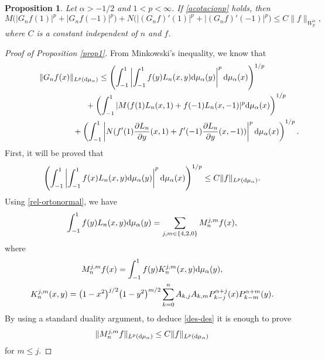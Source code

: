 \documentclass[pdftex]{sigma}
\newtheorem{propo}[thm]{Proposition}
\numberwithin{equation}{section}
\begin{document}
\begin{propo}\label{prop2} Let $\alpha>-1/2$ and $1<p<\infty$. If \eqref{acotacionp} holds, then
	\begin{equation*}
M\big(|G_nf(1)|^p+|G_nf(-1)|^p\big)+N\big(|(G_nf)'(1)|^p+|(G_nf)'(-1)|^p\big)\le C\|f\|_{W_p^{\alpha}},
	\end{equation*}
where $C$ is a constant independent of $n$ and $f$.
\end{propo}

\begin{proof}[Proof of Proposition \ref{prop1}] From Minkowski's inequality, we know that
	\begin{gather*}
	\|G_nf(x)\|_{L^p({\rm d}\mu_{\alpha})}\le
	\left(\int_{-1}^{1}\left|\int_{-1}^{1}f(y)L_n(x,y) {\rm d}{\mu_{\alpha}}(y)\right|^p {\rm d}\mu_{\alpha}(x)\right)^{1/p}\\
\hphantom{\|G_nf(x)\|_{L^p({\rm d}\mu_{\alpha})}\le}{}	+\left(\int_{-1}^{1}|M(f(1)L_n(x,1)+f(-1)L_n(x,-1)|^p {\rm d}\mu_{\alpha}(x)\right)^{1/p}\\
\hphantom{\|G_nf(x)\|_{L^p({\rm d}\mu_{\alpha})}\le}{}	+\left(\int_{-1}^{1}\left|N(f'(1)\frac{\partial L_n}{\partial y}(x,1)+f'(-1)\frac{\partial L_n}{\partial y}(x,-1))\right|^p {\rm d}\mu_{\alpha}(x)\right)^{1/p}.
	\end{gather*}	
First, it will be proved that
\begin{gather}\label{des-des}
\left(\int_{-1}^{1}\left|\int_{-1}^{1}f(x)L_n(x,y) {\rm d}\mu_{\alpha}(y)\right|^p {\rm d}\mu_{\alpha}(x)\right)^{1/p}\le C\|f\|_{L^p({\rm d}\mu_{\alpha})}.
	\end{gather}
Using \eqref{rel-ortonormal}, we have
	\begin{gather*}
	\int_{-1}^{1}f(y)L_n(x,y) {\rm d}\mu_{\alpha}(y)=\sum_{j,m\in \{4,2,0\}}M_n^{j,m}f(x),
	\end{gather*}
where
\begin{gather*}
M_n^{j,m}f(x)=\int_{-1}^{1} f(y) K_n^{j,m}(x,y) {\rm d}\mu_\alpha(y),\\
K_n^{j,m}(x,y)=\big(1-x^2\big)^{j/2}\big(1-y^2\big)^{m/2}\sum_{k=0}^{n}A_{k,j}A_{k,m}P_{k-j}^{\alpha+j}(x)P_{k-m}^{\alpha+m}(y).
\end{gather*}
By using a standard duality argument, to deduce \eqref{des-des} it is enough to prove
\begin{gather*}
\|M_n^{j,m}f\|_{L^p({\rm d}\mu_{\alpha})}\le C\|f\|_{L^p({\rm d}\mu_{\alpha})}
\end{gather*}
for $m\le j$.


\end{proof}
\end{document}
